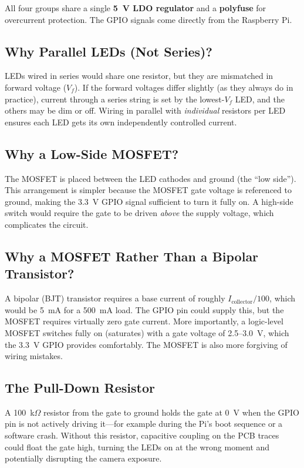 \documentclass[12pt,letterpaper]{article}
\begin{document}
All four groups share a single \textbf{5~V LDO regulator} and a \textbf{polyfuse} for
overcurrent protection. The GPIO signals come directly from the Raspberry Pi.

\subsection{Why Parallel LEDs (Not Series)?}

LEDs wired in series would share one resistor, but they are mismatched in forward voltage
($V_f$). If the forward voltages differ slightly (as they always do in practice), current
through a series string is set by the lowest-$V_f$ LED, and the others may be dim or
off. Wiring in parallel with \emph{individual} resistors per LED ensures each LED gets
its own independently controlled current.

\subsection{Why a Low-Side MOSFET?}

The MOSFET is placed between the LED cathodes and ground (the ``low side'').
This arrangement is simpler because the MOSFET gate voltage is referenced to ground,
making the 3.3~V GPIO signal sufficient to turn it fully on. A high-side switch would
require the gate to be driven \emph{above} the supply voltage, which complicates the
circuit.

\subsection{Why a MOSFET Rather Than a Bipolar Transistor?}

A bipolar (BJT) transistor requires a base current of roughly $I_\text{collector}/100$,
which would be 5~mA for a 500~mA load. The GPIO pin could supply this, but the MOSFET
requires virtually zero gate current. More importantly, a logic-level MOSFET switches
fully on (saturates) with a gate voltage of 2.5--3.0~V, which the 3.3~V GPIO provides
comfortably. The MOSFET is also more forgiving of wiring mistakes.

\subsection{The Pull-Down Resistor}

A 100~k$\Omega$ resistor from the gate to ground holds the gate at 0~V when the GPIO
pin is not actively driving it---for example during the Pi's boot sequence or a software
crash. Without this resistor, capacitive coupling on the PCB traces could float the gate
high, turning the LEDs on at the wrong moment and potentially disrupting the camera
exposure.
\end{document}
